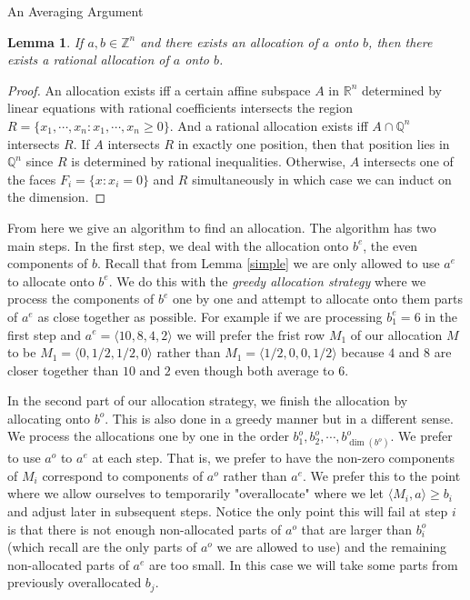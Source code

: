 \documentclass[11pt,a4paper]{article}
\newtheorem{lemma}[subsection]{Lemma}
\begin{document}
\begin{section}{An Averaging Argument}
\begin{lemma} \label{allocation_implies_rational_allocation} If $a, b \in \mathbb{Z}^n$ and there exists an allocation of $a$ onto $b$, then there exists a rational allocation of $a$ onto $b$.
\end{lemma}
\begin{proof} An allocation exists iff a certain affine subspace $A$ in $\mathbb{R}^n$ determined by linear equations with rational coefficients intersects the region $ R = \{x_1, \cdots, x_n : x_1, \cdots , x_n \geq 0 \}$. And a rational allocation exists iff $A \cap \mathbb{Q}^n$ intersects $R$. If $A$ intersects $R$ in exactly one position, then that position lies in $\mathbb{Q}^n$ since $R$ is determined by rational inequalities. Otherwise, $A$ intersects one of the faces $F_i = \{x : x_i = 0 \}$ and $R$ simultaneously in which case we can induct on the dimension.
\end{proof}
From here we give an algorithm to find an allocation. The algorithm has two main steps. In the first step, we deal with the allocation onto $b^e$, the even components of $b$. Recall that from Lemma \ref{simple} we are only allowed to use $a^e$ to allocate onto $b^e$. We do this with the \textit{greedy allocation strategy} where we process the components of $b^e$ one by one and attempt to allocate onto them parts of $a^e$ as close together as possible. For example if we are processing $b^e_1 = 6$ in the first step and $a^e = \langle 10, 8, 4, 2 \rangle$ we will prefer the frist row $M_1$ of our allocation $M$ to be $M_1 = \langle 0, 1/2, 1/2, 0 \rangle$ rather than $M_1 = \langle 1/2 , 0, 0, 1/2 \rangle$ because $4$ and $8$ are closer together than $10$ and $2$ even though both average to $6$.

\medskip

In the second part of our allocation strategy, we finish the allocation by allocating onto $b^o$. This is also done in a greedy manner but in a different sense. We process the allocations one by one in the order $b^o_1, b^o_2, \cdots, b^o_{\dim(b^o)}$. We prefer to use $a^o$ to $a^e$ at each step. That is, we prefer to have the non-zero components of $M_i$ correspond to components of $a^o$ rather than $a^e$. We prefer this to the point where we allow ourselves to temporarily "overallocate" where we let $\langle M_i, a \rangle \geq b_i$ and adjust later in subsequent steps. Notice the only point this will fail at step $i$ is that there is not enough non-allocated parts of $a^o$ that are larger than $b^o_i$ (which recall are the only parts of $a^o$ we are allowed to use) and the remaining non-allocated parts of $a^e$ are too small. In this case we will take some parts from previously overallocated $b_j$.


\end{section}
\end{document}
